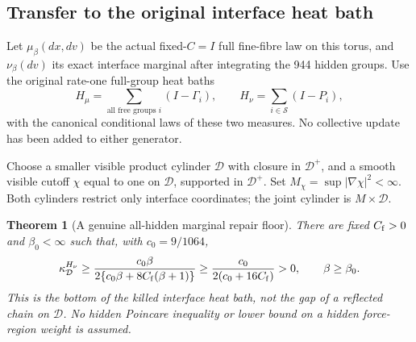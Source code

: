 \documentclass[11pt,oneside]{article}
\newtheorem{theorem}{Theorem}[section]
\begin{document}
\subsection{Transfer to the original interface heat bath}

Let \(\mu_\beta(dx,dv)\) be the actual
fixed-\(C=I\) full fine-fibre law on this
torus, and \(\nu_\beta(dv)\) its exact
interface marginal after integrating
the 944 hidden groups. Use the original
rate-one full-group heat baths
\[
 H_\mu=\sum_{\text{all free groups }i}(I-\Gamma_i),
 \qquad
 H_\nu=\sum_{i\in\mathcal S}(I-P_i),
\]
with the canonical conditional laws of
these two measures. No collective update
has been added to either generator.

Choose a smaller visible product cylinder
\(\mathcal D\) with closure in
\(\mathcal D^+\), and a smooth visible
cutoff \(\chi\) equal to one on
\(\mathcal D\), supported in
\(\mathcal D^+\). Set
\(M_\chi=\sup|\nabla\chi|^2<\infty\).
Both cylinders restrict only interface
coordinates; the joint cylinder is
\(M\times\mathcal D\).

\begin{theorem}[A genuine all-hidden marginal repair floor]
\label{thm:f13v13-floor}
There are fixed \(C_{\rm f}>0\) and
\(\beta_0<\infty\) such that, with
\(c_0=9/1064\),
\begin{equation}\label{eq:f13v13-floor}
 \kappa_{\mathcal D}^{H_\nu}
 \ge\frac{c_0\beta}
       {2\{c_0\beta+8C_{\rm f}(\beta+1)\}}
 \ge\frac{c_0}{2(c_0+16C_{\rm f})}>0,
                         \qquad\beta\ge\beta_0 .
\end{equation}
This is the bottom of the killed
interface heat bath, not the gap of a
reflected chain on \(\mathcal D\).
No hidden Poincare inequality or lower
bound on a hidden force-region weight
is assumed.
\end{theorem}
\end{document}
